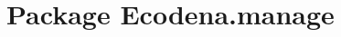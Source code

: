 \hypertarget{namespace_ecodena_1_1manage}{
\section{Package Ecodena.manage}
\label{d3/dfa/namespace_ecodena_1_1manage}
}
